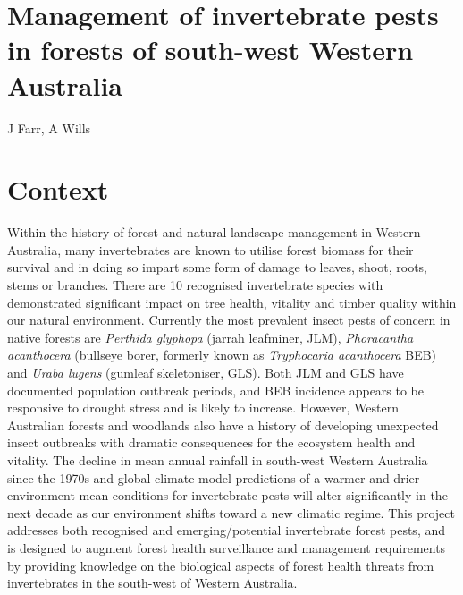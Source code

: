 \documentclass[version=last, 
    paper=a4, %
    10pt, %
    usenames,
    dvipsnames, 
    oneside, %
    headings=openany, %
    DIV=15 %
]{scrbook}
\begin{document}
\section*{Management of invertebrate pests in forests of south-west Western
Australia
}

J Farr, A Wills


\section*{Context}
Within the history of forest and natural landscape management in Western
Australia, many invertebrates are known to utilise forest biomass for
their survival and in doing so impart some form of damage to leaves,
shoot, roots, stems or branches. There are 10 recognised invertebrate
species with demonstrated significant impact on tree health, vitality
and timber quality within our natural environment. Currently the most
prevalent insect pests of concern in native forests are \emph{Perthida
glyphopa} (jarrah leafminer, JLM), \emph{Phoracantha acanthocera}
(bullseye borer, formerly known as \emph{Tryphocaria acanthocera} BEB)
and \emph{Uraba lugens} (gumleaf skeletoniser, GLS). Both JLM and GLS
have documented population outbreak periods, and BEB incidence appears
to be responsive to drought stress and is likely to increase. However,
Western Australian forests and woodlands also have a history of
developing unexpected insect outbreaks with dramatic consequences for
the ecosystem health and vitality. The decline in mean annual rainfall
in south-west Western Australia since the 1970s and global climate model
predictions of a warmer and drier environment mean conditions for
invertebrate pests will alter significantly in the next decade as our
environment shifts toward a new climatic regime. This project addresses
both recognised and emerging/potential invertebrate forest pests, and is
designed to augment forest health surveillance and management
requirements by providing knowledge on the biological aspects of forest
health threats from invertebrates in the south-west of Western
Australia.
\end{document}
